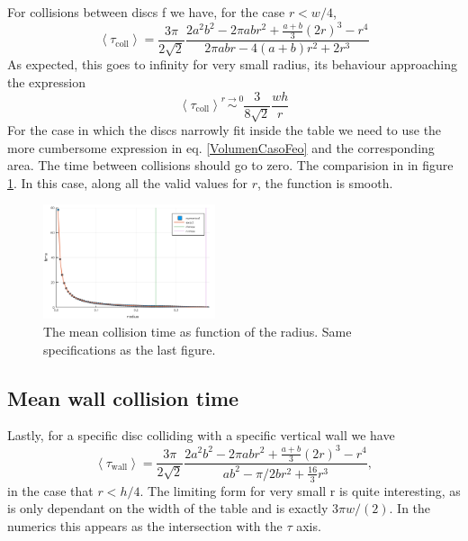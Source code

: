 \documentclass[superscriptaddress,pre,reprint,showpacs,onecolumn]{revtex4-1}
\newcommand{\mean}[1]{\left \langle #1 \right \rangle}
\begin{document}
For collisions between discs f we have, for the case $r<w/4$,
\begin{equation}\label{colltau}
 \mean{\tau_\text{coll}} = 	
\frac{3 \pi}{2\sqrt{2}}
\frac {2 a^{2} b^{2}  - 2 \pi a b r^{2} + \textstyle \frac{a+b}{3}  (2r)^{3}  -  r^4}
{2\pi a b r -4(a+b)r^2+2r^3}
\end{equation}
As expected, this goes to infinity for very small radius, its behaviour
approaching the expression
\begin{equation}\label{colltaulim0}
\mean{\tau_\text{coll}} \overset{r \to 0}{\sim}
\frac{3}{8\sqrt{2}}\frac{wh}{r}
\end{equation}
For the case in which the discs narrowly fit inside the table we need to
use the more cumbersome expression in eq. \ref{VolumenCasoFeo} and
the corresponding area. The time between collisions should go to zero.
The comparision in in figure \ref{MeanCol01}. In this case, along all
the valid values for $r$, the function is smooth. 

\begin{figure}[h]
  \centering
  \includegraphics[width=0.45\textwidth]{./figures/DiscCollitions01.png}
  \caption{The mean collision time as function of the radius. Same
    specifications as the last figure. }\label{MeanCol01}
\end{figure}



\subsection{Mean wall collision time}

Lastly, for a specific disc colliding with a specific vertical wall we have
\begin{equation}\label{impactwall}
 \mean{\tau_\text{wall}} = 	
\frac{3 \pi}{2\sqrt{2}}
\frac { 2a^{2} b^{2}  -  2\pi a b r^{2} + \frac{a+b}{3}(2r)^3 - r^4}
{ab^2-\pi/2b r^2 + \frac{16}{3} r^3 },
\end{equation}
in the case that $r<h/4$. The limiting form for very small r is
quite interesting, as is only dependant on the width of the table and is exactly
$3\pi w/(2)$. In the numerics this appears as the intersection with the $\tau$
axis.
\end{document}
